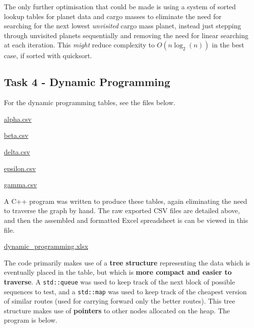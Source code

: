 \documentclass[
]{article}
\begin{document}
The only further optimisation that could be made is using a system of
sorted lookup tables for planet data and cargo masses to eliminate the
need for searching for the next lowest \emph{unvisited} cargo mass
planet, instead just stepping through unvisited planets sequentially and
removing the need for linear searching at each iteration. This
\emph{might} reduce complexity to \(O(n\log_2(n))\) in the best case, if
sorted with quicksort.

\subsection{Task 4 - Dynamic
Programming}\label{task-4---dynamic-programming}

For the dynamic programming tables, see the files below.

\url{alpha.csv}

\url{beta.csv}

\url{delta.csv}

\url{epsilon.csv}

\url{gamma.csv}

A C++ program was written to produce these tables, again eliminating the
need to traverse the graph by hand. The raw exported CSV files are
detailed above, and then the assembled and formatted Excel spreadsheet
is can be viewed in this file.

\url{dynamic_programming.xlsx}

The code primarily makes use of a \textbf{tree structure} representing
the data which is eventually placed in the table, but which is
\textbf{more compact and easier to traverse}. A \texttt{std::queue} was
used to keep track of the next block of possible sequences to test, and
a \texttt{std::map} was used to keep track of the cheapest version of
similar routes (used for carrying forward only the better routes). This
tree structure makes use of \textbf{pointers} to other nodes allocated
on the heap. The program is below.
\end{document}
